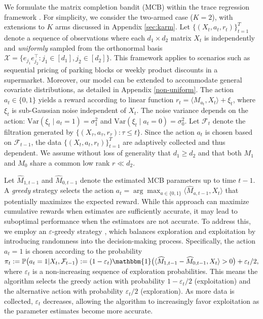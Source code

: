 \documentclass[12pt]{article}
\newcommand{\inp}[2]{\langle #1,#2\rangle}
\newcommand{\PP}{\mathbb{P}}
\def\calF{{\mathcal F}}
\def\calX{{\mathcal X}}
\def\PP{{\mathbb P}}
\def\hat{\widehat}
\def\eps{\varepsilon}
\theoremstyle{plain}
\begin{document}


We formulate the matrix completion bandit (MCB) within the trace regression framework \citep{koltchinskii2011nuclear}. For simplicity, we consider the two-armed case ($K=2$), with extensions to $K$ arms discussed in Appendix \ref{sec:karm}. Let $\{(X_t, a_t, r_t)\}_{t=1}^T$ denote a sequence of observations where each $d_1 \times d_2$ matrix $X_t$ is independently and \emph{uniformly} sampled from the orthonormal basis $\calX=\big\{e_{j_1}e_{j_2}^{\top}: j_1\in[d_1], j_2\in[d_2]\big\}$.  This framework applies to scenarios such as sequential pricing of parking blocks or weekly product discounts in a supermarket. Moreover, our model can be extended to accommodate general covariate distributions, as detailed in Appendix \ref{non-uniform}. The action $a_t\in\{0,1\}$ yields a reward according to linear function
$r_t=\langle M_{a_t}, X_t\rangle+\xi_t$, 
where $\xi_t$ is sub-Gaussian noise independent of $X_t$. The noise variance depends on the action: $\mathrm{Var}(\xi_t \mid a_t=1) = \sigma_1^2$ and $\mathrm{Var}(\xi_t \mid a_t=0) = \sigma_0^2$. Let $\mathcal{F}_t$ denote the filtration generated by $\{(X_\tau, a_\tau, r_\tau) : \tau \leq t\}$. Since the action $a_t$ is chosen based on $\mathcal{F}_{t-1}$, the data $\{(X_t, a_t, r_t)\}_{t=1}^T$ are adaptively collected and thus dependent. We assume without loss of generality that $d_1 \geq d_2$ and that both $M_1$ and $M_0$ share a common low rank $r \ll d_2$.


Let $\hat M_{1,t-1}$ and $\hat M_{0, t-1}$ denote the estimated MCB parameters up to time $t-1$. A \emph{greedy} strategy selects the action $a_t=\arg\max_{a\in\{0,1\}} \langle \hat M_{a, t-1}, X_t\rangle$ that potentially maximizes the expected reward. While this approach can maximize cumulative rewards when estimates are sufficiently accurate, it may lead to suboptimal performance when the estimators are not accurate. To address this, we employ an $\varepsilon$-greedy strategy \citep{sutton2018reinforcement, lattimore2020bandit}, which balances exploration and exploitation by introducing randomness into the decision-making process. Specifically, the action $a_t=1$ is chosen according to the probability $
\pi_t:=\PP\big(a_t=1|X_t, \calF_{t-1}\big):=(1-\eps_t)\mathbbm{1}\big(\inp{\hat M_{1, t-1}-\hat M_{0,t-1}}{X_t}>0\big) +\eps_t/2,
$
where $\varepsilon_t$ is a non-increasing sequence of exploration probabilities. This means the algorithm selects the greedy action with probability $1-\varepsilon_t/2$ (exploitation) and the alternative action with probability $\varepsilon_t/2$ (exploration). As more data is collected, $\varepsilon_t$ decreases, allowing the algorithm to increasingly favor exploitation as the parameter estimates become more accurate.
 
\end{document}
